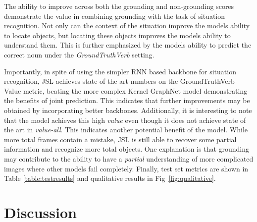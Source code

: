 \documentclass[runningheads]{llncs}
\begin{document}
The ability to improve across both the grounding and non-grounding scores demonstrate the value in combining grounding with the task of situation recognition. Not only can the context of the situation improve the models ability to locate objects, but locating these objects improves the models ability to understand them. This is further emphasized by the models ability to predict the correct noun under the \emph{GroundTruthVerb} setting. 

Importantly, in spite of using the simpler RNN based backbone for situation recognition, JSL achieves state of the art numbers on the GroundTruthVerb-Value metric, beating the more complex Kernel GraphNet model demonstrating the benefits of joint prediction. This indicates that further improvements may be obtained by incorporating better backbones. Additionally, it is interesting to note that the model achieves this high \emph{value} even though it does not achieve state of the art in \emph{value-all}. This indicates another potential benefit of the model. While more total frames contain a mistake, JSL is still able to recover some partial information and recognize more total objects. One explanation is that grounding may contribute to the ability to have a \emph{partial} understanding of more complicated images where other models fail completely. Finally, test set metrics are shown in Table \ref{table:testresults} and qualitative results in Fig~\ref{fig:qualitative}.

















    




    
    








    



    


    
 \vspace{-3mm}
\section{Discussion}
\label{sec:discussion}
\end{document}
